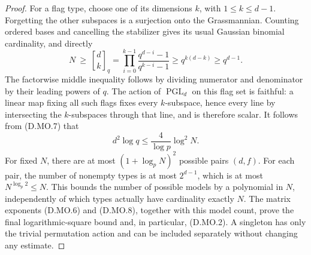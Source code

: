 \begin{proof}
For a flag type, choose one of its dimensions $k$, with
$1\le k\le d-1$. Forgetting the other subspaces is a
surjection onto the Grassmannian. Counting ordered bases
and cancelling the stabilizer gives its usual Gaussian
binomial cardinality, and directly
\[
 N\ \ge\ \genfrac{[}{]}{0pt}{}{d}{k}_q
   =\prod_{i=0}^{k-1}\frac{q^{d-i}-1}{q^{k-i}-1}
   \ge q^{k(d-k)}\ge q^{d-1}.                            \tag{D.MO.7}
\]
The factorwise middle inequality follows by dividing numerator
and denominator by their leading powers of $q$.
The action of $\operatorname{PGL}_d$ on this flag set is
faithful: a linear map fixing all such flags fixes every
$k$-subspace, hence every line by intersecting the
$k$-subspaces through that line, and is therefore scalar.
It follows from (D.MO.7) that
\[
       d^2\log q\le\frac{4}{\log p}\log^2N.              \tag{D.MO.8}
\]
For fixed $N$, there are at most
$(1+\log_pN)^2$ possible pairs $(d,f)$. For each pair, the
number of nonempty types is at most $2^{d-1}$, which is
at most $N^{\log_p2}\le N$. This bounds the number of
possible models by a polynomial in $N$, independently
of which types actually have cardinality exactly $N$.
The matrix exponents (D.MO.6) and (D.MO.8), together with
this model count, prove the final logarithmic-square
bound and, in particular, (D.MO.2). A singleton has only
the trivial permutation action and can be included
separately without changing any estimate.
\end{proof}


